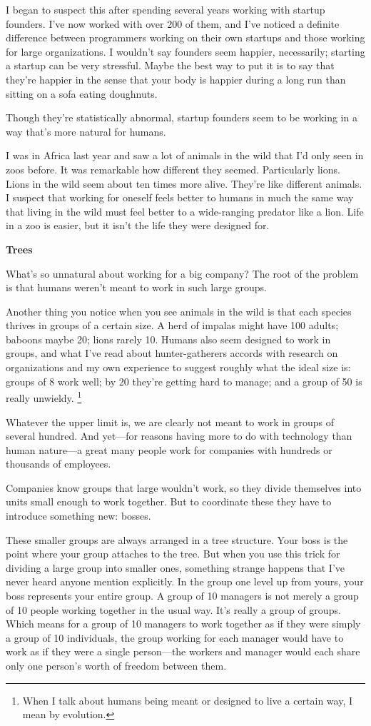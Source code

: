 \documentclass[12pt]{book}
\begin{document}
I began to suspect this after spending several years working with
startup founders. I've now worked with over 200 of them, and I've
noticed a definite difference between programmers working on their own
startups and those working for large organizations. I wouldn't say
founders seem happier, necessarily; starting a startup can be very
stressful. Maybe the best way to put it is to say that they're happier
in the sense that your body is happier during a long run than sitting on
a sofa eating doughnuts.

Though they're statistically abnormal, startup founders seem to be
working in a way that's more natural for humans.

I was in Africa last year and saw a lot of animals in the wild that I'd
only seen in zoos before. It was remarkable how different they seemed.
Particularly lions. Lions in the wild seem about ten times more alive.
They're like different animals. I suspect that working for oneself feels
better to humans in much the same way that living in the wild must feel
better to a wide-ranging predator like a lion. Life in a zoo is easier,
but it isn't the life they were designed for.

\textbf{Trees}

What's so unnatural about working for a big company? The root of the
problem is that humans weren't meant to work in such large groups.

Another thing you notice when you see animals in the wild is that each
species thrives in groups of a certain size. A herd of impalas might
have 100 adults; baboons maybe 20; lions rarely 10. Humans also seem
designed to work in groups, and what I've read about hunter-gatherers
accords with research on organizations and my own experience to suggest
roughly what the ideal size is: groups of 8 work well; by 20 they're
getting hard to manage; and a group of 50 is really unwieldy.
\footnote{When I talk about humans being meant or designed to live a
certain way, I mean by evolution.}

Whatever the upper limit is, we are clearly not meant to work in groups
of several hundred. And yet---for reasons having more to do with
technology than human nature---a great many people work for companies
with hundreds or thousands of employees.

Companies know groups that large wouldn't work, so they divide
themselves into units small enough to work together. But to coordinate
these they have to introduce something new: bosses.

These smaller groups are always arranged in a tree structure. Your boss
is the point where your group attaches to the tree. But when you use
this trick for dividing a large group into smaller ones, something
strange happens that I've never heard anyone mention explicitly. In the
group one level up from yours, your boss represents your entire group. A
group of 10 managers is not merely a group of 10 people working together
in the usual way. It's really a group of groups. Which means for a group
of 10 managers to work together as if they were simply a group of 10
individuals, the group working for each manager would have to work as if
they were a single person---the workers and manager would each share
only one person's worth of freedom between them.
\end{document}

